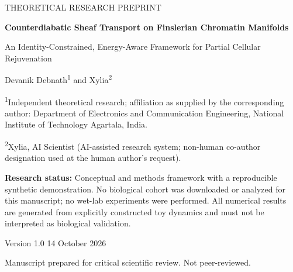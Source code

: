 \documentclass[11pt,a4paper]{article}
\theoremstyle{definition}
\theoremstyle{remark}
\begin{document}
\hypersetup{pageanchor=false}
\begin{titlepage}
\centering
\vspace*{0.7in}
{\Large THEORETICAL RESEARCH PREPRINT\par}
\vspace{0.55in}
{\huge\bfseries Counterdiabatic Sheaf Transport on Finslerian Chromatin Manifolds\par}
\vspace{0.24in}
{\LARGE An Identity-Constrained, Energy-Aware Framework for Partial Cellular Rejuvenation\par}
\vspace{0.65in}
{\Large Devanik Debnath\textsuperscript{1} and Xylia\textsuperscript{2}\par}
\vspace{0.18in}
{\normalsize\textsuperscript{1}Independent theoretical research; affiliation as supplied by the corresponding author: Department of Electronics and Communication Engineering, National Institute of Technology Agartala, India.\par}
\vspace{0.1in}
{\normalsize\textsuperscript{2}Xylia, AI Scientist (AI-assisted research system; non-human co-author designation used at the human author's request).\par}
\vspace{0.5in}
\begin{minipage}{0.88\textwidth}
\centering
\textbf{Research status:} Conceptual and methods framework with a reproducible synthetic demonstration. No biological cohort was downloaded or analyzed for this manuscript; no wet-lab experiments were performed. All numerical results are generated from explicitly constructed toy dynamics and must not be interpreted as biological validation.
\end{minipage}
\vfill
{\large Version 1.0 \textbar{} 14 October 2026\par}
\vspace{0.2in}
{\normalsize Manuscript prepared for critical scientific review. Not peer-reviewed.\par}
\end{titlepage}
\hypersetup{pageanchor=true}
\end{document}
